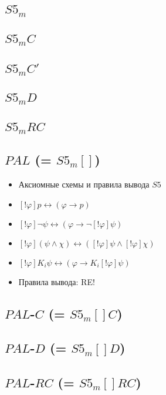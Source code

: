 \documentclass[11pt]{article}
\begin{document}
\subsection{$S5_m$}


\subsection{$S5_mC$}
\subsection{$S5_mC'$}
\subsection{$S5_mD$}
\subsection{$S5_mRC$}

\subsection{$PAL$ (= $S5_m[]$)}
\begin{itemize}
\item Аксиомные схемы и правила вывода $S5$	
\item $[!\varphi]p \leftrightarrow (\varphi \to p)$
\item $[!\varphi]\neg \psi \leftrightarrow (\varphi \to \neg[!\varphi]\psi)$
\item $[!\varphi](\psi \wedge \chi) \leftrightarrow ([!\varphi]\psi \wedge [!\varphi]\chi)$
\item $[!\varphi]K_i\psi \leftrightarrow (\varphi \to K_i[!\varphi]\psi)$
\item Правила вывода: RE!
\end{itemize}

\subsection{$PAL$-$C$ (= $S5_m[]C$)}
\subsection{$PAL$-$D$ (= $S5_m[]D$)}
\subsection{$PAL$-$RC$ (= $S5_m[]RC$)}
\end{document}

